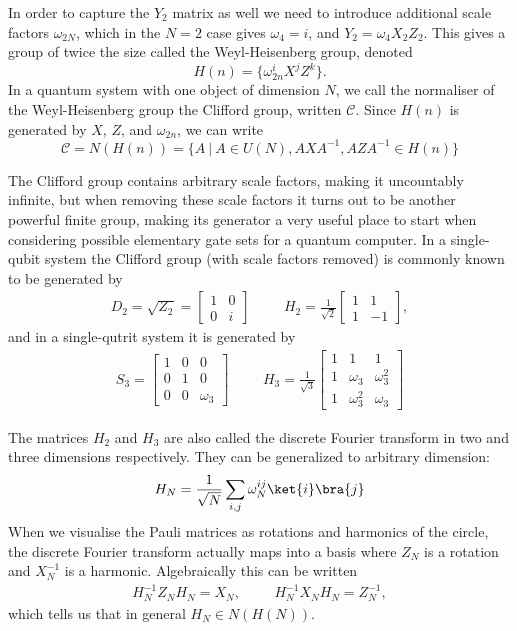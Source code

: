In order to capture the $Y_2$ matrix as well we need to introduce additional scale factors $\omega_{2N}$, which in the $N=2$ case gives $\omega_4 = i$, and $Y_2 = \omega_{4}X_2Z_2$. This gives a group of twice the size called the Weyl-Heisenberg group, denoted
\[H(n) = \{\omega_{2n}^iX^jZ^k\}.\]
In a quantum system with one object of dimension $N$, we call the normaliser of the Weyl-Heisenberg group the Clifford group, written $\mathcal{C}$. Since $H(n)$ is generated by $X$, $Z$, and $\omega_{2n}$, we can write
\[\mathcal{C} = N(H(n)) = \{A\ |\ A \in U(N), AXA^{-1}, AZA^{-1} \in H(n)\}\]

The Clifford group contains arbitrary scale factors, making it uncountably infinite, but when removing these scale factors it turns out to be another powerful finite group, making its generator a very useful place to start when considering possible elementary gate sets for a quantum computer. In a single-qubit system the Clifford group (with scale factors removed) is commonly known to be generated by
\begin{align*}
D_2 = \sqrt{Z_2} = \begin{bmatrix}
1 & 0 \\
0 & i
\end{bmatrix}
&&&
H_2 = \frac{1}{\sqrt{2}}\begin{bmatrix}
1 & 1 \\
1 & -1
\end{bmatrix},
\end{align*}
and in a single-qutrit system it is generated by
\begin{align*}
S_3 = \begin{bmatrix}
1 & 0 & 0 \\
0 & 1 & 0 \\
0 & 0 & \omega_3
\end{bmatrix}
&&&
H_3 = \frac{1}{\sqrt{3}}\begin{bmatrix}
1 & 1 & 1 \\
1 & \omega_3 & \omega_3^2 \\
1 & \omega_3^2 & \omega_3
\end{bmatrix}
\end{align*}

The matrices $H_2$ and $H_3$ are also called the discrete Fourier transform in two and three dimensions respectively. They can be generalized to arbitrary dimension:
\[H_N = \frac{1}{\sqrt{N}}\sum_{i,j} \omega_N^{ij}\ket{i}\bra{j}\]
When we visualise the Pauli matrices as rotations and harmonics of the circle, the discrete Fourier transform actually maps into a basis where $Z_N$ is a rotation and $X_N^{-1}$ is a harmonic. Algebraically this can be written
\begin{align*}
H_N^{-1}Z_NH_N = X_N, &&& H_N^{-1}X_NH_N = Z_N^{-1},
\end{align*}
which tells us that in general $H_N \in N(H(N))$.

